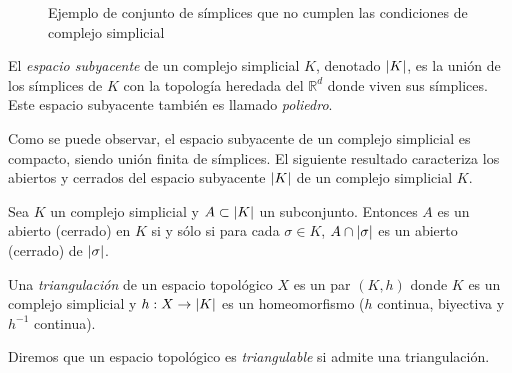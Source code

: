 \begin{figure}[ht]
\centering
{}
\caption{Ejemplo de conjunto de símplices que no cumplen las condiciones de complejo simplicial}
\label{ref:noComp}
\end{figure}

\begin{definition}
El \emph{espacio subyacente} de un complejo simplicial $K$, denotado $\lvert K\rvert$, es la unión de los símplices de $K$ con la topología heredada del $\mathbb{R}^d$ donde viven sus símplices. Este espacio subyacente también es llamado \emph{poliedro}.
\end{definition}
Como se puede observar, el espacio subyacente  de un complejo simplicial es compacto, siendo unión finita de símplices. El siguiente resultado caracteriza los abiertos y cerrados del espacio subyacente $\lvert K\rvert$ de un complejo simplicial $K$.

\begin{proposition}
\cite[p.~150]{libroEH}
Sea $K$ un complejo simplicial y $A \subset \lvert K\rvert$ un subconjunto. Entonces $A$ es un abierto (cerrado) en $K$ si y sólo si para cada $\sigma \in K$, $A \cap \lvert\sigma\rvert$ es un abierto (cerrado) de $\lvert\sigma\rvert$.
\end{proposition}

\begin{definition}
Una \emph{triangulación} de un espacio topológico $X$ es un par $(K, h)$ donde $K$ es un complejo simplicial y $h: X \to \lvert K\rvert$ es un homeomorfismo ($h$ continua, biyectiva y $h^{-1}$ continua).
\end{definition}
Diremos que un espacio topológico es \emph{triangulable} si admite una triangulación.

